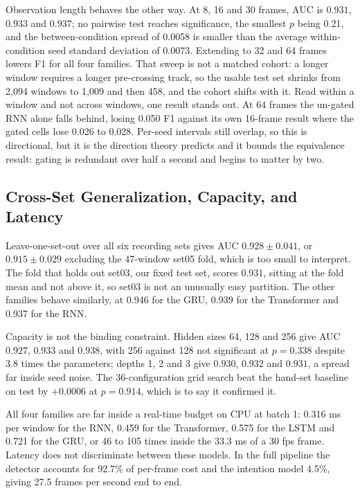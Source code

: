 \documentclass[mti,article,submit,moreauthors]{Definitions/mdpi}
\begin{document}
Observation length behaves the other way. At 8, 16 and 30 frames, AUC is $0.931$, $0.933$ and $0.937$; no pairwise test reaches significance, the smallest $p$ being 0.21, and the between-condition spread of 0.0058 is smaller than the average within-condition seed standard deviation of 0.0073. Extending to 32 and 64 frames lowers F1 for all four families. That sweep is not a matched cohort: a longer window requires a longer pre-crossing track, so the usable test set shrinks from 2,094 windows to 1,009 and then 458, and the cohort shifts with it. Read within a window and not across windows, one result stands out. At 64 frames the un-gated RNN alone falls behind, losing 0.050 F1 against its own 16-frame result where the gated cells lose 0.026 to 0.028. Per-seed intervals still overlap, so this is directional, but it is the direction theory predicts and it bounds the equivalence result: gating is redundant over half a second and begins to matter by two.

\subsection{Cross-Set Generalization, Capacity, and Latency}

Leave-one-set-out over all six recording sets gives AUC $0.928 \pm 0.041$, or $0.915 \pm 0.029$ excluding the 47-window set05 fold, which is too small to interpret. The fold that holds out set03, our fixed test set, scores 0.931, sitting at the fold mean and not above it, so set03 is not an unusually easy partition. The other families behave similarly, at 0.946 for the GRU, 0.939 for the Transformer and 0.937 for the RNN.

Capacity is not the binding constraint. Hidden sizes 64, 128 and 256 give AUC $0.927$, $0.933$ and $0.938$, with 256 against 128 not significant at $p = 0.338$ despite 3.8 times the parameters; depths 1, 2 and 3 give $0.930$, $0.932$ and $0.931$, a spread far inside seed noise. The 36-configuration grid search beat the hand-set baseline on test by $+0.0006$ at $p = 0.914$, which is to say it confirmed it.

All four families are far inside a real-time budget on CPU at batch 1: 0.316 ms per window for the RNN, 0.459 for the Transformer, 0.575 for the LSTM and 0.721 for the GRU, or 46 to 105 times inside the 33.3 ms of a 30 fps frame. Latency does not discriminate between these models. In the full pipeline the detector accounts for 92.7\% of per-frame cost and the intention model 4.5\%, giving 27.5 frames per second end to end.
\end{document}
